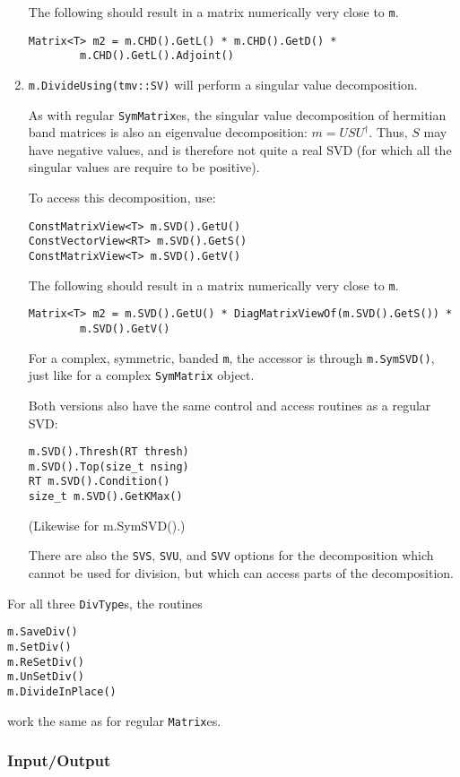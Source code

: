 \documentclass[twoside,letterpaper,11pt]{article}
\renewcommand{\tt}[1]{{\texttt {#1}}}
\begin{document}
\begin{enumerate}
The following should result in a matrix numerically very close to \tt{m}.
\begin{verbatim}
Matrix<T> m2 = m.CHD().GetL() * m.CHD().GetD() * 
        m.CHD().GetL().Adjoint()
\end{verbatim}

\item
\tt{m.DivideUsing(tmv::SV)} will perform a singular value decomposition.

As with regular \tt{SymMatrix}es, the singular value decomposition of 
hermitian band matrices is also an eigenvalue decomposition: $m = USU^\dagger$.
Thus, $S$ may have negative values, and is therefore not quite a real
SVD (for which all the singular values are require to be positive).

To access this decomposition, use:
\begin{verbatim}
ConstMatrixView<T> m.SVD().GetU()
ConstVectorView<RT> m.SVD().GetS()
ConstMatrixView<T> m.SVD().GetV()
\end{verbatim}
The following should result in a matrix numerically very close to \tt{m}.
\begin{verbatim}
Matrix<T> m2 = m.SVD().GetU() * DiagMatrixViewOf(m.SVD().GetS()) * 
        m.SVD().GetV()
\end{verbatim}

For a complex, symmetric, banded \tt{m}, the accessor is through
\tt{m.SymSVD()}, just like for a complex \tt{SymMatrix} object.

Both versions also have the same control and access routines as a regular SVD:
\begin{verbatim}
m.SVD().Thresh(RT thresh)
m.SVD().Top(size_t nsing)
RT m.SVD().Condition()
size_t m.SVD().GetKMax()
\end{verbatim}
(Likewise for m.SymSVD().)

There are also the \tt{SVS}, \tt{SVU}, and \tt{SVV} options for the decomposition
which cannot be used for division, but which can access parts of the decomposition.

\end{enumerate}

For all three \tt{DivType}s, the routines 
\begin{verbatim}
m.SaveDiv()
m.SetDiv()
m.ReSetDiv()
m.UnSetDiv()
m.DivideInPlace()
\end{verbatim}
work the same as for regular \tt{Matrix}es.

\subsubsection{Input/Output}
\end{document}
